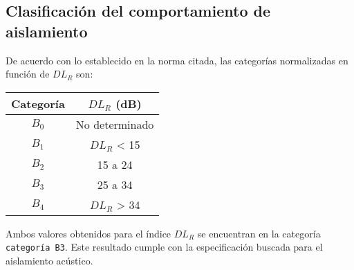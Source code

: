 		\subsection{Clasificación del comportamiento de aislamiento}
		
		De acuerdo con lo establecido en la norma citada, las categorías normalizadas en función de $DL_R$ son:
		
		\begin{table}[h!]
			\centering
			\begin{tabular}{cc}
			\toprule
			\textbf{Categoría} & \textbf{$DL_R$ (dB)}\\
			\midrule
			$B_0$ & No determinado\\
			$B_1$ & $DL_R$ < 15 \\
			$B_2$ & 15 a 24 \\
			$B_3$ & 25 a 34 \\
			$B_4$ & $DL_R$ > 34 \\
			\bottomrule
			\end{tabular}
		\end{table}
		
		Ambos valores obtenidos para el índice $DL_R$ se encuentran en la categoría \texttt{categoría B3}. Este resultado cumple con la especificación buscada para el aislamiento acústico.
